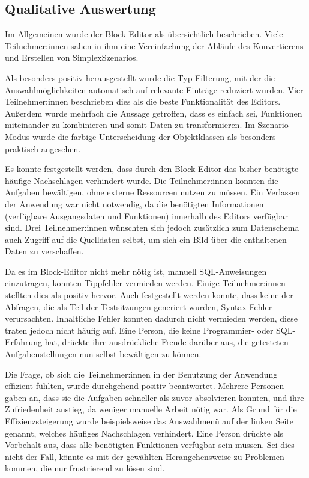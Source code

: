 \subsection{Qualitative Auswertung}
\label{sec:qualitative}

Im Allgemeinen wurde der Block-Editor als übersichtlich beschrieben. Viele Teilnehmer:innen sahen in ihm eine Vereinfachung der Abläufe des Konvertierens und Erstellen von SimplexSzenarios.

Als besonders positiv herausgestellt wurde die Typ-Filterung, mit der die Auswahlmöglichkeiten automatisch auf relevante Einträge reduziert wurden. Vier Teilnehmer:innen beschrieben dies als die beste Funktionalität des Editors. Außerdem wurde mehrfach die Aussage getroffen, dass es einfach sei, Funktionen miteinander zu kombinieren und somit Daten zu transformieren. Im Szenario-Modus wurde die farbige Unterscheidung der Objektklassen als besonders praktisch angesehen.

Es konnte festgestellt werden, dass durch den Block-Editor das bisher benötigte häufige Nachschlagen verhindert wurde. Die Teilnehmer:innen konnten die Aufgaben bewältigen, ohne externe Ressourcen nutzen zu müssen. Ein Verlassen der Anwendung war nicht notwendig, da die benötigten Informationen (verfügbare Ausgangsdaten und Funktionen) innerhalb des Editors verfügbar sind. Drei Teilnehmer:innen wünschten sich jedoch zusätzlich zum Datenschema auch Zugriff auf die Quelldaten selbst, um sich ein Bild über die enthaltenen Daten zu verschaffen.

Da es im Block-Editor nicht mehr nötig ist, manuell \ac{SQL}-Anweisungen einzutragen, konnten Tippfehler vermieden werden. Einige Teilnehmer:innen stellten dies als positiv hervor. Auch festgestellt werden konnte, dass keine der Abfragen, die als Teil der Testsitzungen generiert wurden, Syntax-Fehler verursachten. Inhaltliche Fehler konnten dadurch nicht vermieden werden, diese traten jedoch nicht häufig auf. Eine Person, die keine Programmier- oder \ac{SQL}-Erfahrung hat, drückte ihre ausdrückliche Freude darüber aus, die getesteten Aufgabenstellungen nun selbst bewältigen zu können.

Die Frage, ob sich die Teilnehmer:innen in der Benutzung der Anwendung effizient fühlten, wurde durchgehend positiv beantwortet. Mehrere Personen gaben an, dass sie die Aufgaben schneller als zuvor absolvieren konnten, und ihre Zufriedenheit anstieg, da weniger manuelle Arbeit nötig war. Als Grund für die Effizienzsteigerung wurde beispielsweise das Auswahlmenü auf der linken Seite genannt, welches häufiges Nachschlagen verhindert. Eine Person drückte als Vorbehalt aus, dass alle benötigten Funktionen verfügbar sein müssen. Sei dies nicht der Fall, könnte es mit der gewählten Herangehensweise zu Problemen kommen, die nur frustrierend zu lösen sind.


